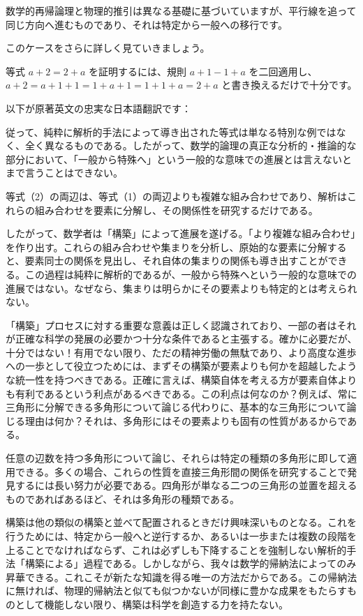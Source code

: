 \documentclass[a4paper,11pt,openany]{ltjsbook}
\begin{document}
数学的再帰論理と物理的推引は異なる基礎に基づいていますが、平行線を追って同じ方向へ進むものであり、それは特定から一般への移行です。

このケースをさらに詳しく見ていきましょう。

等式 \(a + 2 = 2 + a\) を証明するには、規則 \(a + 1 - 1 + a\) を二回適用し、\(a + 2 = a + 1 + 1 = 1 + a + 1 = 1 + 1 + a = 2 + a\) と書き換えるだけで十分です。

以下が原著英文の忠実な日本語翻訳です：

従って、純粋に解析的手法によって導き出された等式は単なる特別な例ではなく、全く異なるものである。したがって、数学的論理の真正な分析的・推論的な部分において、「一般から特殊へ」という一般的な意味での進展とは言えないとまで言うことはできない。

等式（2）の両辺は、等式（1）の両辺よりも複雑な組み合わせであり、解析はこれらの組み合わせを要素に分解し、その関係性を研究するだけである。

したがって、数学者は「構築」によって進展を遂げる。「より複雑な組み合わせ」を作り出す。これらの組み合わせや集まりを分析し、原始的な要素に分解すると、要素同士の関係を見出し、それ自体の集まりの関係も導き出すことができる。この過程は純粋に解析的であるが、一般から特殊へという一般的な意味での進展ではない。なぜなら、集まりは明らかにその要素よりも特定的とは考えられない。

「構築」プロセスに対する重要な意義は正しく認識されており、一部の者はそれが正確な科学の発展の必要かつ十分な条件であると主張する。確かに必要だが、十分ではない！有用でない限り、ただの精神労働の無駄であり、より高度な進歩への一歩として役立つためには、まずその構築が要素よりも何かを超越したような統一性を持つべきである。正確に言えば、構築自体を考える方が要素自体よりも有利であるという利点があるべきである。この利点は何なのか？例えば、常に三角形に分解できる多角形について論じる代わりに、基本的な三角形について論じる理由は何か？それは、多角形にはその要素よりも固有の性質があるからである。

任意の辺数を持つ多角形について論じ、それらは特定の種類の多角形に即して適用できる。多くの場合、これらの性質を直接三角形間の関係を研究することで発見するには長い努力が必要である。四角形が単なる二つの三角形の並置を超えるものであればあるほど、それは多角形の種類である。

構築は他の類似の構築と並べて配置されるときだけ興味深いものとなる。これを行うためには、特定から一般へと逆行するか、あるいは一歩または複数の段階を上ることでなければならず、これは必ずしも下降することを強制しない解析的手法「構築による」過程である。しかしながら、我々は数学的帰納法によってのみ昇華できる。これこそが新たな知識を得る唯一の方法だからである。この帰納法に無ければ、物理的帰納法と似ても似つかないが同様に豊かな成果をもたらすものとして機能しない限り、構築は科学を創造する力を持たない。
\end{document}
